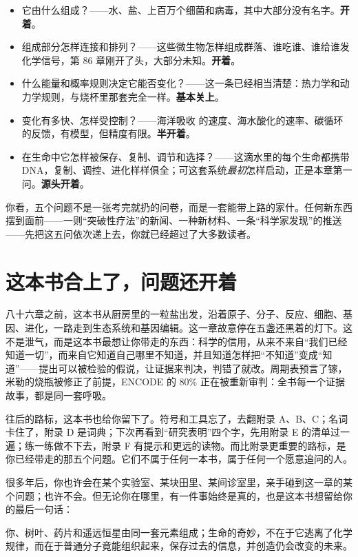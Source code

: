 \begin{itemize}[itemsep=2pt]
\item 它由什么组成？——水、盐、上百万个细菌和病毒，其中大部分没有名字。\textbf{开着}。
\item 组成部分怎样连接和排列？——这些微生物怎样组成群落、谁吃谁、谁给谁发化学信号，第 86 章刚开了头，大部分未知。\textbf{开着}。
\item 什么能量和概率规则决定它能否变化？——这一条已经相当清楚：热力学和动力学规则，与烧杯里那套完全一样。\textbf{基本关上}。
\item 变化有多快、怎样受控制？——海洋吸收  的速度、海水酸化的速率、碳循环的反馈，有模型，但精度有限。\textbf{半开着}。
\item 在生命中它怎样被保存、复制、调节和选择？——这滴水里的每个生命都携带 DNA，复制、调控、进化样样俱全；可这套系统\emph{最初}怎样启动，正是本章第一问。\textbf{源头开着}。
\end{itemize}

你看，五个问题不是一张考完就扔的问卷，而是一套能带上路的家什。任何新东西摆到面前——一则“突破性疗法”的新闻、一种新材料、一条“科学家发现”的推送——先把这五问依次递上去，你就已经超过了大多数读者。

\section{这本书合上了，问题还开着}

八十六章之前，这本书从厨房里的一粒盐出发，沿着原子、分子、反应、细胞、基因、进化，一路走到生态系统和基因编辑。这一章故意停在五盏还黑着的灯下。这不是泄气，而是这本书最想让你带走的东西：科学的信用，从来不来自“我们已经知道一切”，而来自它知道自己哪里不知道，并且知道怎样把“不知道”变成“知道”——提出可以被检验的假说，让证据来判决，判错了就改。周期表预言了镓，米勒的烧瓶被修正了前提，ENCODE 的 80\% 正在被重新审判：全书每一个证据故事，都是同一套呼吸。

往后的路标，这本书也给你留下了。符号和工具忘了，去翻附录 A、B、C；名词卡住了，附录 D 是词典；下次再看到“研究表明”四个字，先用附录 E 的清单过一遍；练一练做不下去，附录 F 有提示和更远的读物。而比附录更重要的路标，是你已经带走的那五个问题。它们不属于任何一本书，属于任何一个愿意追问的人。

很多年后，你也许会在某个实验室、某块田里、某间诊室里，亲手碰到这一章的某个问题；也许不会。但无论你在哪里，有一件事始终是真的，也是这本书想留给你的最后一句话：

你、树叶、药片和遥远恒星由同一套元素组成；生命的奇妙，不在于它逃离了化学规律，而在于普通分子竟能组织起来，保存过去的信息，并创造仍会改变的未来。

